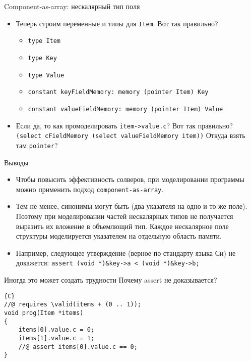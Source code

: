 \documentclass[hyperref={unicode=true}]{beamer}
\begin{document}
    \begin{frame}{Component-as-array: нескалярный тип поля}
    \begin{itemize}
    \item
    Теперь строим переменные и типы для \texttt{Item}. Вот так правильно?
        \begin{itemize}
        \item \texttt{type Item}
        \item \texttt{type Key}
        \item \texttt{type Value}
        \item \texttt{constant keyFieldMemory: memory (pointer Item) Key}
        \item \texttt{constant valueFieldMemory: memory (pointer Item) Value}
        \end{itemize}
    \item
    Если да, то как промоделировать \texttt{item->value.c}? Вот так
    правильно?
    \texttt{(select cFieldMemory (select valueFieldMemory item))}
    Откуда взять там \texttt{pointer}?
    \end{itemize}
    \end{frame}

    \begin{frame}{Выводы}
    \begin{itemize}
    \item
    Чтобы повысить эффективность солверов, при моделировании программы
    можно применить подход \texttt{component-as-array}.
    \item
    Тем не менее, синонимы могут быть (два указателя на одно и то же поле).
    Поэтому при моделировании частей нескалярных типов не получается
    выразить их вложение в объемлющий тип. Каждое нескалярное поле структуры
    моделируется указателем на отдельную область памяти.
    \item
    Например, следующее утверждение (верное по стандарту языка Си)
    не докажется: \texttt{assert (void *)\&key->a < (void *)\&key->b;}
    \end{itemize}
    \end{frame}

    \begin{frame}[fragile]{Иногда это может создать трудности}
    Почему assert не доказывается?
    \begin{lstlisting}{C}
//@ requires \valid(items + (0 .. 1));
void prog(Item *items)
{
    items[0].value.c = 0;
    items[1].value.c = 1;
    //@ assert items[0].value.c == 0;
}
    \end{lstlisting}
    \end{frame}
\end{document}
